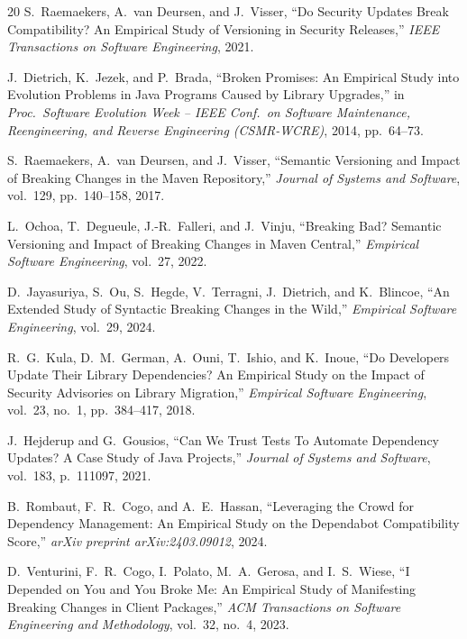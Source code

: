 \documentclass[10pt,journal]{IEEEtran}
\begin{document}
\begin{thebibliography}{20}
S.~Raemaekers, A.~van Deursen, and J.~Visser, ``Do Security Updates Break Compatibility? An Empirical Study of Versioning in Security Releases,'' \emph{IEEE Transactions on Software Engineering}, 2021.

J.~Dietrich, K.~Jezek, and P.~Brada, ``Broken Promises: An Empirical Study into Evolution Problems in Java Programs Caused by Library Upgrades,'' in \emph{Proc.\ Software Evolution Week -- IEEE Conf.\ on Software Maintenance, Reengineering, and Reverse Engineering (CSMR-WCRE)}, 2014, pp.\ 64--73.

S.~Raemaekers, A.~van Deursen, and J.~Visser, ``Semantic Versioning and Impact of Breaking Changes in the Maven Repository,'' \emph{Journal of Systems and Software}, vol.\ 129, pp.\ 140--158, 2017.

L.~Ochoa, T.~Degueule, J.-R.~Falleri, and J.~Vinju, ``Breaking Bad? Semantic Versioning and Impact of Breaking Changes in Maven Central,'' \emph{Empirical Software Engineering}, vol.\ 27, 2022.

D.~Jayasuriya, S.~Ou, S.~Hegde, V.~Terragni, J.~Dietrich, and K.~Blincoe, ``An Extended Study of Syntactic Breaking Changes in the Wild,'' \emph{Empirical Software Engineering}, vol.\ 29, 2024.

R.~G.~Kula, D.~M.~German, A.~Ouni, T.~Ishio, and K.~Inoue, ``Do Developers Update Their Library Dependencies? An Empirical Study on the Impact of Security Advisories on Library Migration,'' \emph{Empirical Software Engineering}, vol.\ 23, no.\ 1, pp.\ 384--417, 2018.

J.~Hejderup and G.~Gousios, ``Can We Trust Tests To Automate Dependency Updates? A Case Study of Java Projects,'' \emph{Journal of Systems and Software}, vol.\ 183, p.\ 111097, 2021.

B.~Rombaut, F.~R.~Cogo, and A.~E.~Hassan, ``Leveraging the Crowd for Dependency Management: An Empirical Study on the Dependabot Compatibility Score,'' \emph{arXiv preprint arXiv:2403.09012}, 2024.

D.~Venturini, F.~R.~Cogo, I.~Polato, M.~A.~Gerosa, and I.~S.~Wiese, ``I Depended on You and You Broke Me: An Empirical Study of Manifesting Breaking Changes in Client Packages,'' \emph{ACM Transactions on Software Engineering and Methodology}, vol.\ 32, no.\ 4, 2023.


\end{thebibliography}
\end{document}
